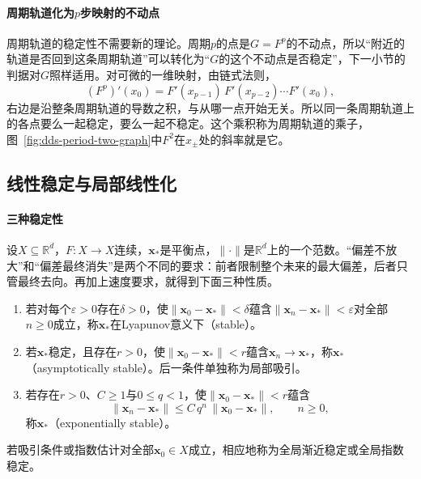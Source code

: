 \paragraph{周期轨道化为$p$步映射的不动点}
周期轨道的稳定性不需要新的理论。周期$p$的点是$G=F^p$的不动点，所以“附近的轨道是否回到这条周期轨道”可以转化为“$G$的这个不动点是否稳定”，下一小节的判据对$G$照样适用。对可微的一维映射，由链式法则，
\begin{equation}
  (F^p)'(x_0)=F'(x_{p-1})\,F'(x_{p-2})\cdots F'(x_0),
  \label{eq:dds-period-multiplier}
\end{equation}
右边是沿整条周期轨道的导数之积，与从哪一点开始无关。所以同一条周期轨道上的各点要么一起稳定，要么一起不稳定。这个乘积称为周期轨道的乘子，图~\ref{fig:dds-period-two-graph}中$F^2$在$x_\pm$处的斜率就是它。

\subsection{线性稳定与局部线性化}
\label{sec:dds-linear-stability}

\paragraph{三种稳定性}
设$X\subseteq\mathbb R^d$，$F:X\to X$连续，$\bm x_*$是平衡点，$\lVert\cdot\rVert$是$\mathbb R^d$上的一个范数。“偏差不放大”和“偏差最终消失”是两个不同的要求：前者限制整个未来的最大偏差，后者只管最终去向。再加上速度要求，就得到下面三种性质。

\begin{definition}[平衡点的稳定性]
\label{def:dds-stability}
\begin{enumerate}
  \item 若对每个$\varepsilon>0$存在$\delta>0$，使$\lVert\bm x_0-\bm x_*\rVert<\delta$蕴含$\lVert\bm x_n-\bm x_*\rVert<\varepsilon$对全部$n\geq0$成立，称$\bm x_*$在Lyapunov意义下（stable）。
  \item 若$\bm x_*$稳定，且存在$r>0$，使$\lVert\bm x_0-\bm x_*\rVert<r$蕴含$\bm x_n\to\bm x_*$，称$\bm x_*$（asymptotically stable）。后一条件单独称为局部吸引。
  \item 若存在$r>0$、$C\geq1$与$0\leq q<1$，使$\lVert\bm x_0-\bm x_*\rVert<r$蕴含
  \[
    \lVert\bm x_n-\bm x_*\rVert\leq C\,q^n\,\lVert\bm x_0-\bm x_*\rVert,\qquad n\geq0,
  \]
  称$\bm x_*$（exponentially stable）。
\end{enumerate}
若吸引条件或指数估计对全部$\bm x_0\in X$成立，相应地称为全局渐近稳定或全局指数稳定。
\end{definition}

